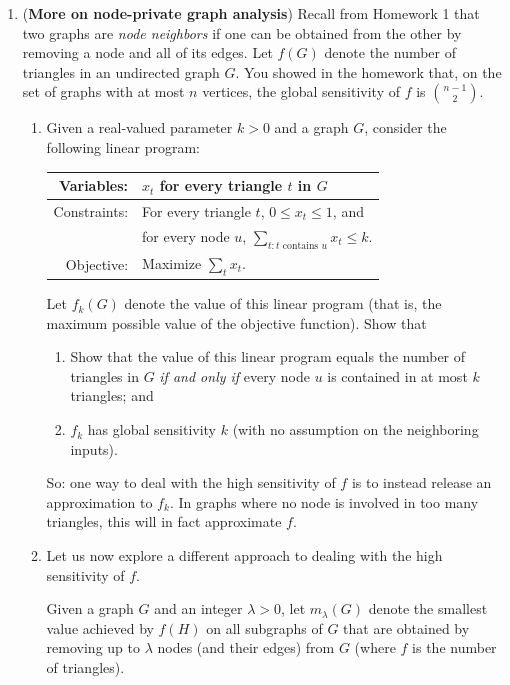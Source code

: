 \documentclass[11pt]{article}
\begin{document}
\begin{enumerate}[leftmargin=\parindent, itemsep=3ex]
\begin{enumerate}
    \end{enumerate}

    \item (\textbf{More on node-private graph analysis})
    Recall from Homework 1 that two graphs are \emph{node neighbors} if one can be obtained from the other by removing a node and all of its edges. Let $f(G)$ denote the number of triangles in an undirected graph $G$. You showed in the homework that, on the set of graphs with at most $n$ vertices, the global sensitivity of $f$ is $\binom {n-1} 2$.

    \begin{enumerate}
      \item Given a real-valued parameter $k>0$ and a graph $G$, consider the following linear program: 
      \begin{center}
      \begin{tabular}{|r l|}
          Variables: & $x_t$ for every triangle $t$ in $G$\\
          \hline
          Constraints: & For every triangle $t$, \qquad $0\leq x_t \leq 1$, and \\
          & for every node $u$, \qquad $\displaystyle \sum_{t: t \text{ contains }u} x_t \leq k$.\\
          \hline 
          Objective: & Maximize $\displaystyle\sum_t x_t$.
      \end{tabular}
      \end{center}
      Let $f_k(G)$ denote the value of this linear program (that is, the maximum possible value of the objective function). Show that 
      \begin{enumerate}
          \item Show that the value of this linear program equals the number of triangles in $G$ \emph{if and only if} every node $u$ is contained in at most $k$ triangles; and
          \item $f_k$ has global sensitivity $k$ (with no assumption on the neighboring inputs).
      \end{enumerate}

      So: one way to deal with the high sensitivity of $f$ is to instead release an approximation to $f_k$. In graphs where no node is involved in too many triangles, this will in fact approximate $f$.

    \item Let us now explore a different approach to dealing with the high sensitivity of $f$. 
    
    Given a graph $G$ and an integer $\lambda >0$, let $m_\lambda(G)$ denote the smallest value achieved by $f(H)$ on all subgraphs of $G$ that are obtained 
    by removing up to $\lambda$ nodes (and their edges) from $G$ (where $f$ is the number of triangles). 


\end{enumerate}
\end{enumerate}
\end{document}
